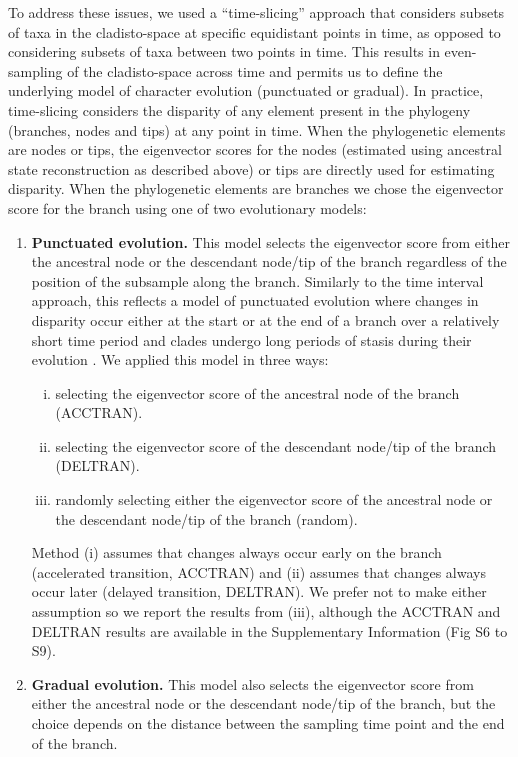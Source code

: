\documentclass[12pt,letterpaper]{article}
\begin{document}
To address these issues, we used a ``time-slicing'' approach that considers subsets of taxa in the cladisto-space at specific equidistant points in time, as opposed to considering subsets of taxa between two points in time.
This results in even-sampling of the cladisto-space across time and permits us to define the underlying model of character evolution (punctuated or gradual).  
In practice, time-slicing considers the disparity of any element present in the phylogeny (branches, nodes and tips) at any point in time.
When the phylogenetic elements are nodes or tips, the eigenvector scores for the nodes (estimated using ancestral state reconstruction as described above) or tips are directly used for estimating disparity.
When the phylogenetic elements are branches we chose the eigenvector score for the branch using one of two evolutionary models:
\begin{enumerate}
    \item{\textbf{Punctuated evolution.}} 
    This model selects the eigenvector score from either the ancestral node or the descendant node/tip of the branch regardless of the position of the subsample along the branch. 
    Similarly to the time interval approach, this reflects a model of punctuated evolution where changes in disparity occur either at the start or at the end of a branch over a relatively short time period and clades undergo long periods of stasis during their evolution \cite{Gould1977,Hunt21042015}.
    We applied this model in three ways: 
    \begin{enumerate}[(i)]
      \item selecting the eigenvector score of the ancestral node of the branch (ACCTRAN).
      \item selecting the eigenvector score of the descendant node/tip of the branch (DELTRAN).
      \item randomly selecting either the eigenvector score of the ancestral node or the descendant node/tip of the branch (random).
    \end{enumerate}
    Method (i) assumes that changes always occur early on the branch (accelerated transition, ACCTRAN) and (ii) assumes that changes always occur later (delayed transition, DELTRAN).
    We prefer not to make either assumption so we report the results from (iii), although the ACCTRAN and DELTRAN results are available in the Supplementary Information (Fig S6 to S9).
    \item{\textbf{Gradual evolution.}}
    This model also selects the eigenvector score from either the ancestral node or the descendant node/tip of the branch, but the choice depends on the distance between the sampling time point and the end of the branch.

\end{enumerate}
\end{document}
